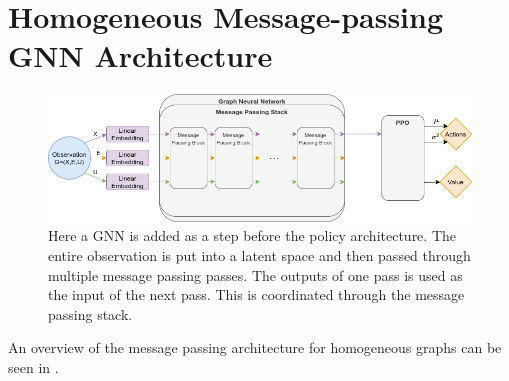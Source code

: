 \section{Homogeneous Message-passing GNN Architecture}
\begin{figure}[htp]
    \centering
    \includegraphics[width=1.0\textwidth]{figures/homogeneous_gnn.png}
    \hspace{1cm}   
    \caption{Here a GNN is added as a step before the policy architecture. The entire observation is put into a latent space and then passed through multiple message passing passes. The outputs of one pass is used as the input of the next pass. This is coordinated through the message passing stack.}
    \label{fig:homogeneous_gnn}
\end{figure}

An overview of the message passing architecture for homogeneous graphs can be seen in .

